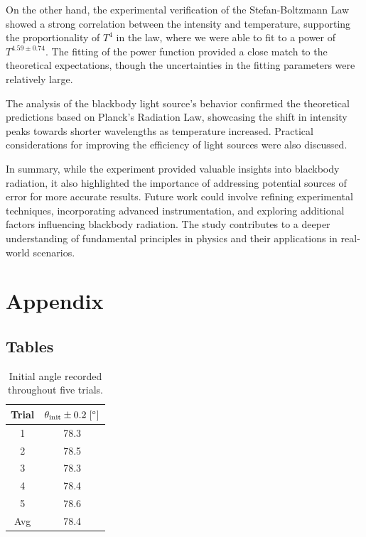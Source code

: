 \documentclass[12pt]{article}
\begin{document}
On the other hand, the experimental verification of the Stefan-Boltzmann Law showed a strong correlation between the intensity and temperature, supporting the proportionality of $T^4$ in the law, where we were able to fit to a power of $T^{4.59\pm0.74}$. The fitting of the power function provided a close match to the theoretical expectations, though the uncertainties in the fitting parameters were relatively large.

The analysis of the blackbody light source's behavior confirmed the theoretical predictions based on Planck's Radiation Law, showcasing the shift in intensity peaks towards shorter wavelengths as temperature increased. Practical considerations for improving the efficiency of light sources were also discussed.

In summary, while the experiment provided valuable insights into blackbody radiation, it also highlighted the importance of addressing potential sources of error for more accurate results. Future work could involve refining experimental techniques, incorporating advanced instrumentation, and exploring additional factors influencing blackbody radiation. The study contributes to a deeper understanding of fundamental principles in physics and their applications in real-world scenarios.

\newpage
\printbibliography

\section*{Appendix}
\subsection*{Tables}
\begin{table}[htbp]
    \centering
    \vspace{10pt}
          \begin{tabular}{cc}
            \hline
            \textbf{Trial} & \textbf{$\theta_{\rm init}\pm0.2\;[^\circ]$} \\
            \hline
            1 & 78.3 \\
            2 & 78.5 \\
            3 & 78.3 \\
            4 & 78.4 \\
            5 & 78.6 \\
            \hline
            Avg & 78.4\\
            \hline
          \end{tabular}
      \caption{Initial angle recorded throughout five trials.}
      \label{table:initangle}
\end{table}
\end{document}
